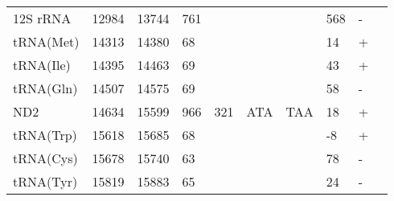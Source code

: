 \documentclass[../DISSERTACAO_MAIN.tex]{subfiles}
\begin{document}
\begin{longtable}{llllllllllllllllllllll}
			12S 				rRNA & 12984          & \multicolumn{2}{l}{13744} & \multicolumn{2}{l}{761}        & \multicolumn{2}{l}{}          & \multicolumn{3}{l}{}                    & \multicolumn{3}{l}{}      & \multicolumn{3}{l}{568}        & \multicolumn{3}{l}{-}      & \multicolumn{2}{l}{} \\
			tRNA(Met)    & 14313          & \multicolumn{2}{l}{14380} & \multicolumn{2}{l}{68}         & \multicolumn{2}{l}{}          & \multicolumn{3}{l}{}                    & \multicolumn{3}{l}{}      & \multicolumn{3}{l}{14}         & \multicolumn{3}{l}{+}      & \multicolumn{2}{l}{} \\
			tRNA(Ile)    & 14395          & \multicolumn{2}{l}{14463} & \multicolumn{2}{l}{69}         & \multicolumn{2}{l}{}          & \multicolumn{3}{l}{}                    & \multicolumn{3}{l}{}      & \multicolumn{3}{l}{43}         & \multicolumn{3}{l}{+}      & \multicolumn{2}{l}{} \\
			tRNA(Gln)    & 14507          & \multicolumn{2}{l}{14575} & \multicolumn{2}{l}{69}         & \multicolumn{2}{l}{}          & \multicolumn{3}{l}{}                    & \multicolumn{3}{l}{}      & \multicolumn{3}{l}{58}         & \multicolumn{3}{l}{-}      & \multicolumn{2}{l}{} \\
			ND2          & 14634          & \multicolumn{2}{l}{15599} & \multicolumn{2}{l}{966}        & \multicolumn{2}{l}{321}       & \multicolumn{3}{l}{ATA}                 & \multicolumn{3}{l}{TAA}   & \multicolumn{3}{l}{18}         & \multicolumn{3}{l}{+}      & \multicolumn{2}{l}{} \\
			tRNA(Trp)    & 15618          & \multicolumn{2}{l}{15685} & \multicolumn{2}{l}{68}         & \multicolumn{2}{l}{}          & \multicolumn{3}{l}{}                    & \multicolumn{3}{l}{}      & \multicolumn{3}{l}{-8}         & \multicolumn{3}{l}{+}      & \multicolumn{2}{l}{} \\
			tRNA(Cys)    & 15678          & \multicolumn{2}{l}{15740} & \multicolumn{2}{l}{63}         & \multicolumn{2}{l}{}          & \multicolumn{3}{l}{}                    & \multicolumn{3}{l}{}      & \multicolumn{3}{l}{78}         & \multicolumn{3}{l}{-}      & \multicolumn{2}{l}{} \\
			tRNA(Tyr)    & 15819          & \multicolumn{2}{l}{15883} & \multicolumn{2}{l}{65}         & \multicolumn{2}{l}{}          & \multicolumn{3}{l}{}                    & \multicolumn{3}{l}{}      & \multicolumn{3}{l}{24}         & \multicolumn{3}{l}{-}      & \multicolumn{2}{l}{}
		\end{longtable}
\end{document}
